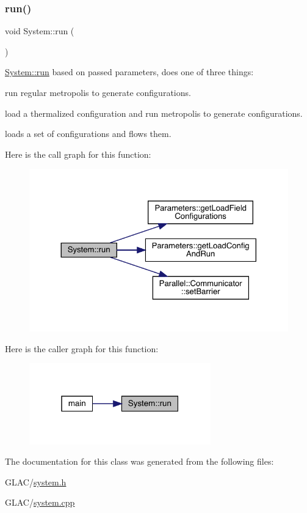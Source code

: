 \subsubsection{\texorpdfstring{run()}{run()}}
{\footnotesize\ttfamily void System\+::run (\begin{DoxyParamCaption}{ }\end{DoxyParamCaption})}



\mbox{\hyperlink{class_system_afa39feb75f96798930f4bfb48205f40b}{System\+::run}} based on passed parameters, does one of three things\+: 


\begin{DoxyItemize}
\item run regular metropolis to generate configurations.
\item load a thermalized configuration and run metropolis to generate configurations.
\item loads a set of configurations and flows them. 
\end{DoxyItemize}Here is the call graph for this function\+:\nopagebreak
\begin{figure}[H]
\begin{center}
\leavevmode
\includegraphics[width=324pt]{class_system_afa39feb75f96798930f4bfb48205f40b_cgraph}
\end{center}
\end{figure}
Here is the caller graph for this function\+:\nopagebreak
\begin{figure}[H]
\begin{center}
\leavevmode
\includegraphics[width=223pt]{class_system_afa39feb75f96798930f4bfb48205f40b_icgraph}
\end{center}
\end{figure}


The documentation for this class was generated from the following files\+:\begin{DoxyCompactItemize}
\item 
G\+L\+A\+C/\mbox{\hyperlink{system_8h}{system.\+h}}\item 
G\+L\+A\+C/\mbox{\hyperlink{system_8cpp}{system.\+cpp}}\end{DoxyCompactItemize}
